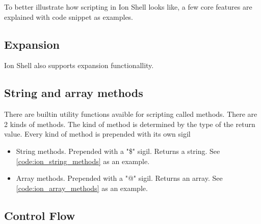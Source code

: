 To better illustrate how scripting in Ion Shell looks like, a few core features are explained with code snippet as examples.

\subsection{Expansion}\label{ion_shell_lang_expansion}

Ion Shell also supports expansion functionallity.

\subsection{String and array methods}\label{ion_shell_lang_methods}

There are builtin utility functions avaible for scripting  called methods.
There are 2 kinds of methods.
The kind of method is determined by the type of the return value.
Every kind of method is prepended with its own sigil

\begin{itemize}
	\item String methods. Prepended with a "\$" sigil. Returns a string. See \ref{code:ion_string_methods} as an example.
	\item Array methods. Prepended with a "@" sigil. Returns an array. See \ref{code:ion_array_methods} as an example.
\end{itemize}


\subsection{Control Flow}\label{ion_shell_lang_control_flow}

